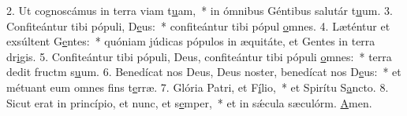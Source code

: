 2. Ut cognoscámus in terra viam t\uline{u}am,~* in ómnibus Géntibus salutár t\uline{u}um.
3. Confiteántur tibi pópuli, D\uline{e}us:~* confiteántur tibi pópul \uline{o}mnes.
4. Læténtur et exsúltent G\uline{e}ntes:~* quóniam júdicas pópulos in æquitáte, et Gentes in terra dr\uline{i}gis.
5. Confiteántur tibi pópuli, Deus, confiteántur tibi pópuli \uline{o}mnes:~* terra dedit fructm s\uline{u}um.
6. Benedícat nos Deus, Deus noster, benedícat nos D\uline{e}us:~* et métuant eum omnes fins t\uline{e}rræ.
7. Glória Patri, et F\uline{í}lio,~* et Spirítu S\uline{a}ncto.
8. Sicut erat in princípio, et nunc, et s\uline{e}mper,~* et in sǽcula sæculórm. \uline{A}men.
